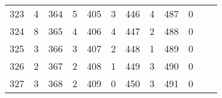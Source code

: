 \begin{table}[H]
\begin{tabular}{S S | S S | S S | S S | S S | S S}
        323 &  4  &  364  &  5  &  405 &    3  &  446 &    4  &  487 &    0  &      &       \\
        324 &  8  &  365  &  4  &  406 &    4  &  447 &    2  &  488 &    0  &      &       \\
        325 &  3  &  366  &  3  &  407 &    2  &  448 &    1  &  489 &    0  &      &       \\
        326 &  2  &  367  &  2  &  408 &    1  &  449 &    3  &  490 &    0  &      &       \\
        327 &  3  &  368  &  2  &  409 &    0  &  450 &    3  &  491 &    0  &      &       \\
  \bottomrule
      \end{tabular}
    \end{table}
